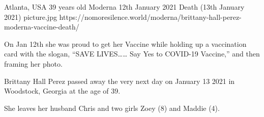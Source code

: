 {Atlanta, USA}
{39 years old}
{Moderna}
{12th January 2021}
{Death (13th January 2021)}
{picture.jpg}
{https://nomoresilence.world/moderna/brittany-hall-perez-moderna-vaccine-death/}
{

On Jan 12th she was proud to get her Vaccine while holding up a vaccination card
with the slogan, “SAVE LIVES…… Say Yes to COVID-19 Vaccine,” and then framing
her photo.

Brittany Hall Perez passed away the very next day on January 13 2021 in
Woodstock, Georgia at the age of 39.

She leaves her husband Chris and two girls Zoey (8) and Maddie (4).

}
